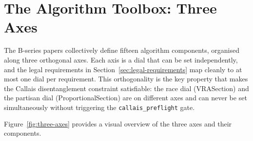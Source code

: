 \section{The Algorithm Toolbox: Three Axes}
\label{sec:components}

The B-series papers collectively define fifteen algorithm components, organised
along three orthogonal axes.
Each axis is a dial that can be set independently, and the legal requirements in
Section~\ref{sec:legal-requirements} map cleanly to at most one dial per requirement.
This orthogonality is the key property that makes the Callais disentanglement
constraint satisfiable: the race dial (VRASection) and the partisan dial
(ProportionalSection) are on different axes and can never be set simultaneously
without triggering the \texttt{callais\_preflight} gate.

Figure~\ref{fig:three-axes} provides a visual overview of the three axes and
their components.

